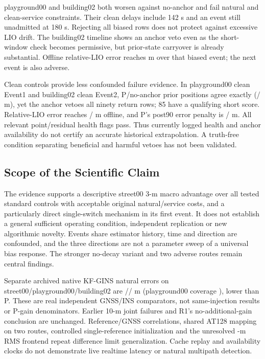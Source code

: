 \documentclass[conference]{IEEEtran}
\begin{document}
\begin{table}[t]
\caption{Six routes, all already seen in this post-hoc analysis. 3-m post90 event-macro errors (m); P natural RMSE / inherited cap (m); maximum actual clean delay $T_c$ (s). Lower raw controls remain visible even outside Q.}\label{tab:routes}
\centering\small\setlength{\tabcolsep}{5pt}

\end{table}

playground00 and building02 both worsen against no-anchor and fail natural and clean-service constraints. Their clean delays include 142 s and an event still unadmitted at 180 s. Rejecting all biased rows does not protect against excessive LIO drift. The building02 timeline shows an anchor veto even as the short-window check becomes permissive, but prior-state carryover is already substantial. Offline relative-LIO error reaches  m over that biased event; the next event is also adverse.

Clean controls provide less confounded failure evidence. In playground00 clean Event1 and building02 clean Event2, P/no-anchor prior positions agree exactly (/ m), yet the anchor vetoes all ninety return rows; 85 have a qualifying short score. Relative-LIO error reaches / m offline, and P's post90 error penalty is / m. All relevant point/residual health flags pass. Thus currently logged health and anchor availability do not certify an accurate historical extrapolation. A truth-free condition separating beneficial and harmful vetoes has not been validated.


\subsection{Scope of the Scientific Claim}
The evidence supports a descriptive street00 3-m macro advantage over all tested standard controls with acceptable original natural/service costs, and a particularly direct single-switch mechanism in its first event. It does not establish a general sufficient operating condition, independent replication or new algorithmic novelty. Events share estimator history, time and direction are confounded, and the three directions are not a parameter sweep of a universal bias response. The stronger no-decay variant and two adverse routes remain central findings.

Separate archived native KF-GINS natural errors on street00/playground00/building02 are // m (playground00 coverage ), lower than P. These are real independent GNSS/INS comparators, not same-injection results or P-gain denominators. Earlier 10-m joint failures and R1's no-additional-gain conclusion are unchanged. Reference/GNSS correlations, shared AT128 mapping on two routes, controlled single-reference initialization and the unresolved -m RMS frontend repeat difference limit generalization. Cache replay and availability clocks do not demonstrate live realtime latency or natural multipath detection.
\end{document}

